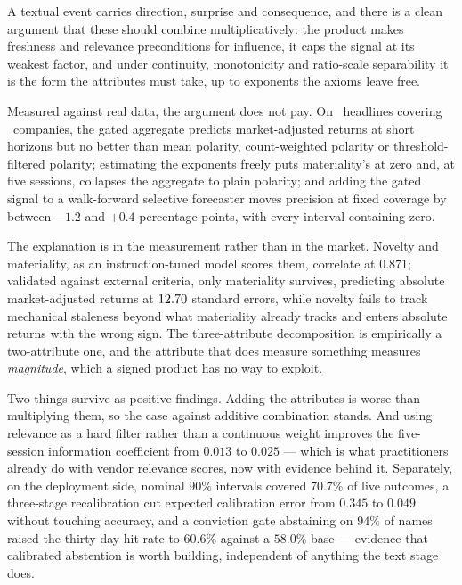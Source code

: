 \documentclass[preprint,12pt,authoryear]{elsarticle}
\theoremstyle{plain}
\theoremstyle{remark}
\begin{document}
A textual event carries direction, surprise and consequence, and there is a clean
argument that these should combine multiplicatively: the product makes freshness
and relevance preconditions for influence, it caps the signal at its weakest
factor, and under continuity, monotonicity and ratio-scale separability it is the
form the attributes must take, up to exponents the axioms leave free.

Measured against real data, the argument does not pay. On \ScoredHeadlines\
headlines covering \NCompanies\ companies, the gated aggregate predicts
market-adjusted returns at short horizons but no better than mean polarity,
count-weighted polarity or threshold-filtered polarity; estimating the exponents
freely puts materiality's at zero and, at five sessions, collapses the aggregate
to plain polarity; and adding the gated signal to a walk-forward selective
forecaster moves precision at fixed coverage by between $-1.2$ and $+0.4$
percentage points, with every interval containing zero.

The explanation is in the measurement rather than in the market. Novelty and
materiality, as an instruction-tuned model scores them, correlate at $0.871$;
validated against external criteria, only materiality survives, predicting
absolute market-adjusted returns at $12.70$ standard errors, while novelty
fails to track mechanical staleness beyond what materiality already tracks and
enters absolute returns with the wrong sign. The three-attribute decomposition is
empirically a two-attribute one, and the attribute that does measure something
measures \emph{magnitude}, which a signed product has no way to exploit.

Two things survive as positive findings. Adding the attributes is worse than
multiplying them, so the case against additive combination stands. And using
relevance as a hard filter rather than a continuous weight improves the
five-session information coefficient from $0.013$ to $0.025$ --- which is what
practitioners already do with vendor relevance scores, now with evidence behind
it. Separately, on the deployment side, nominal $90\%$ intervals covered $70.7\%$
of live outcomes, a three-stage recalibration cut expected calibration error from
$0.345$ to $0.049$ without touching accuracy, and a conviction gate abstaining on
$94\%$ of names raised the thirty-day hit rate to $60.6\%$ against a $58.0\%$
base --- evidence that calibrated abstention is worth building, independent of
anything the text stage does.
\end{document}
